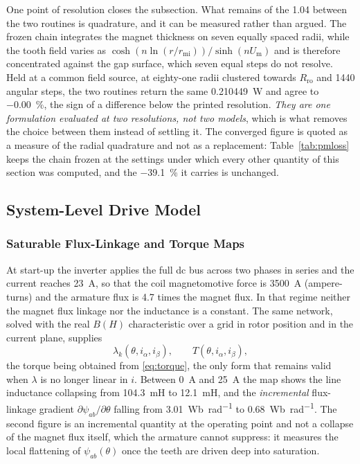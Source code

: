 \documentclass[10pt,a4paper,twocolumn]{article}
\newcommand{\Rro}{R_{\mathrm{ro}}}
\newcommand{\rmi}{r_{\mathrm{mi}}}
\newcommand{\Um}{U_{\mathrm{m}}}
\theoremstyle{plain}
\theoremstyle{remark}
\begin{document}
One point of resolution closes the subsection. What remains of the
\num{1.04} between the two routines is quadrature, and it can be measured
rather than argued. The frozen chain integrates the magnet thickness on
seven equally spaced radii, while the tooth field varies as
$\cosh(n\ln(r/\rmi))/\sinh(n\Um)$ and is therefore concentrated against
the gap surface, which seven equal steps do not resolve. Held at a common
field source, at eighty-one radii clustered towards $\Rro$ and
\num{1440} angular steps, the two routines return the same
\SI{0.210449}{\watt} and agree to
\SI[retain-negative-zero]{-0.00}{\percent}, the sign of a difference below
the printed resolution. \emph{They are
one formulation evaluated at two resolutions, not two models}, which is
what removes the choice between them instead of settling it. The
converged figure is quoted as a measure of the radial quadrature and not
as a replacement: Table~\ref{tab:pmloss} keeps the chain frozen at the
settings under which every other quantity of this section was computed,
and the \SI{-39.1}{\percent} it carries is unchanged.

\subsection{System-Level Drive Model}
\label{sub:drive}

\subsubsection{Saturable Flux-Linkage and Torque Maps}
\label{sub:map}

At start-up the inverter applies the full dc bus across two phases in
series and the current reaches \SI{23}{\ampere}, so that the coil
magnetomotive force is \SI{3500}{\ampere} (ampere-turns) and the armature flux is
4.7 times the magnet flux. In that regime neither the magnet flux
linkage nor the inductance is a constant. The same network, solved with
the real $B(H)$ characteristic over a grid in rotor position and in the
current plane, supplies
\begin{equation}
\lambda_k\!\left(\theta,i_\alpha,i_\beta\right),
\qquad
T\!\left(\theta,i_\alpha,i_\beta\right),
\label{eq:map}
\end{equation}
the torque being obtained from \eqref{eq:torque}, the only form that
remains valid when $\lambda$ is no longer linear in $i$. Between
\SI{0}{\ampere} and \SI{25}{\ampere} the map shows the line inductance
collapsing from \SI{104.3}{\milli\henry} to \SI{12.1}{\milli\henry}, and
the \emph{incremental} flux-linkage gradient
$\partial\psi_{ab}/\partial\theta$ falling from
\SI{3.01}{\weber\per\radian} to \SI{0.68}{\weber\per\radian}. The second
figure is an incremental quantity at the operating point and not a
collapse of the magnet flux itself, which the armature cannot suppress:
it measures the local flattening of $\psi_{ab}(\theta)$ once the teeth
are driven deep into saturation.
\end{document}
